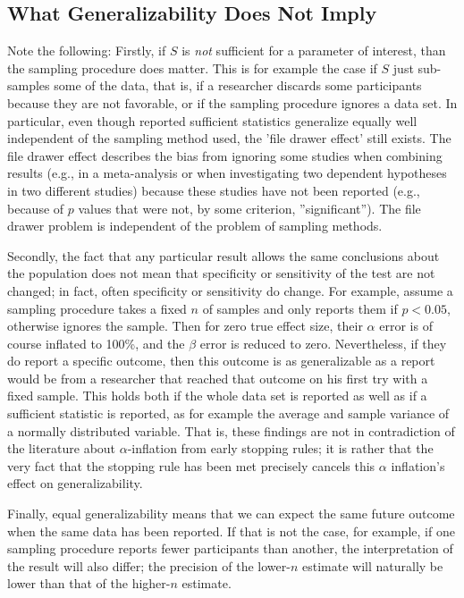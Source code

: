 \documentclass[man]{apa7}
\theoremstyle{definition}
\begin{document}
\subsection{What Generalizability Does Not Imply}
\label{sub:DoesNotImply}
Note the following: Firstly, if $S$ is \emph{not} sufficient for a parameter of interest, than the sampling procedure does matter. This is for example the case if $S$ just sub-samples some of the data, that is, if a researcher discards some participants because they are not favorable, or if the sampling procedure ignores a data set. In particular, even though reported sufficient statistics generalize equally well independent of the sampling method used, the 'file drawer effect' still exists. The file drawer effect describes the bias from ignoring some studies when combining results (e.g., in a meta-analysis or when investigating two dependent hypotheses in two different studies) because these studies have not been reported (e.g., because of $p$ values that were not, by some criterion, ''significant''). The file drawer problem is independent of the problem of sampling methods.

Secondly, the fact that any particular result allows the same conclusions about the population does not mean that specificity or sensitivity of the test are not changed; in fact, often specificity or sensitivity do change. For example, assume a sampling procedure takes a fixed $n$ of samples and only reports them if $p < 0.05$, otherwise ignores the sample. Then for zero true effect size, their $\alpha$ error is of course inflated to 100\%, and the $\beta$ error is reduced to zero. Nevertheless, if they do report a specific outcome, then this outcome is as generalizable as a report would be from a researcher that reached that outcome on his first try with a fixed sample. This holds both if the whole data set is reported as well as if a sufficient statistic is reported, as for example the average and sample variance of a normally distributed variable. That is, these findings are not in contradiction of the literature about $\alpha$-inflation from early stopping rules; it is rather that the very fact that the stopping rule has been met precisely cancels this $\alpha$ inflation's effect on generalizability.

Finally, equal generalizability means that we can expect the same future outcome when the same data has been reported. If that is not the case, for example, if one sampling procedure reports fewer participants than another, the interpretation of the result will also differ; the precision of the lower-$n$ estimate will naturally be lower than that of the higher-$n$ estimate. 
\end{document}
